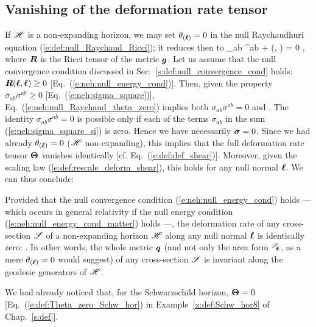 \subsection{Vanishing of the deformation rate tensor}

If $\mathscr{H}$ is a non-expanding horizon, we may set $\theta_{(\bm{\ell})}=0$
in the null Raychaudhuri equation (\ref{e:def:null_Raychaud_Ricci}); it reduces then
to
\be \label{e:neh:null_Raychaud_theta_zero}
    \sigma_{ab} \sigma^{ab} + (\wl, \wl) = 0 ,
\ee
where $\bm{R}$ is the Ricci tensor of the metric $\bm{g}$.
Let us assume that the null convergence condition
discussed in Sec.~\ref{s:def:null_convergence_cond}
holds: $\bm{R}(\bm{\ell}, \bm{\ell}) \geq 0$ [Eq.~(\ref{e:neh:null_energy_cond})].
Then, given the property $\sigma_{ab} \sigma^{ab} \geq 0$
[Eq.~(\ref{e:neh:sigma_square})],
Eq.~(\ref{e:neh:null_Raychaud_theta_zero}) implies both
$\sigma_{ab} \sigma^{ab}  = 0$
and
\be \label{e:neh:R_l_l_zero}
    .
\ee
The identity $\sigma_{ab} \sigma^{ab} = 0$ is possible only if each of
the terms $\sigma_{ab}$ in the sum (\ref{e:neh:sigma_square_si}) is zero. Hence we have necessarily
$\bm{\sigma} = 0$.
Since we had already $\theta_{(\bm{\ell})}=0$ ($\mathscr{H}$ non-expanding), this implies that the full deformation rate tensor
$\bm{\Theta}$
vanishes identically [cf. Eq.~(\ref{e:def:def_shear})]. Moreover,
given the scaling law (\ref{e:def:rescale_deform_shear}), this holds for
any null normal $\bm{\ell}$. We can thus conclude:

\begin{prop}
\label{p:neh:invariance_of_2metric}
Provided that the null convergence condition (\ref{e:neh:null_energy_cond})
holds --- which occurs in general relativity if the
null energy condition
(\ref{e:neh:null_energy_cond_matter})
holds ---,
the deformation rate of any cross-section $\mathscr{S}$ of a non-expanding horizon $\mathscr{H}$
along any null normal $\bm{\ell}$ is identically zero:
\be \label{e:neh:Lie_el_q_zero}
    .
\ee
In other words,
the whole metric $\bm{q}$ (and not only the area form
${}^{\mathscr{S}}\!\!\bm{\epsilon}$, as a mere $\theta_{(\bm{\ell})}=0$ would suggest) of any cross-section
$\mathscr{S}$ is invariant along the geodesic generators of $\mathscr{H}$.
\end{prop}

\begin{example}
We had already noticed that, for the Schwarzschild horizon, $\bm{\Theta}=0$
[Eq.~(\ref{e:def:Theta_zero_Schw_hor}) in Example~\ref{x:def:Schw_hor8}
of Chap.~\ref{s:def}].
\end{example}

